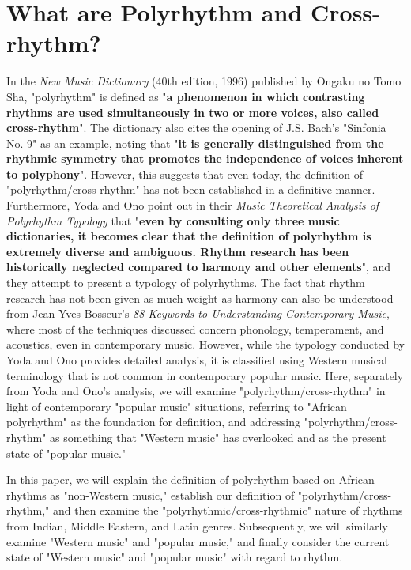 \section{What are Polyrhythm and Cross-rhythm?}

In the \textit{New Music Dictionary} (40th edition, 1996) published by Ongaku no Tomo Sha, "polyrhythm" is defined as "\textbf{a phenomenon in which contrasting rhythms are used simultaneously in two or more voices, also called cross-rhythm}"\cite{asaka:01}. The dictionary also cites the opening of J.S. Bach's "Sinfonia No. 9" as an example, noting that "\textbf{it is generally distinguished from the rhythmic symmetry that promotes the independence of voices inherent to polyphony}"\cite{asaka:01}. However, this suggests that even today, the definition of "polyrhythm/cross-rhythm" has not been established in a definitive manner. Furthermore, Yoda and Ono point out in their \textit{Music Theoretical Analysis of Polyrhythm Typology} that "\textbf{even by consulting only three music dictionaries, it becomes clear that the definition of polyrhythm is extremely diverse and ambiguous. Rhythm research has been historically neglected compared to harmony and other elements}"\cite{yoda-ono:01}, and they attempt to present a typology of polyrhythms. The fact that rhythm research has not been given as much weight as harmony can also be understood from Jean-Yves Bosseur's \textit{88 Keywords to Understanding Contemporary Music}, where most of the techniques discussed concern phonology, temperament, and acoustics, even in contemporary music. However, while the typology conducted by Yoda and Ono provides detailed analysis, it is classified using Western musical terminology that is not common in contemporary popular music. Here, separately from Yoda and Ono's analysis, we will examine "polyrhythm/cross-rhythm" in light of contemporary "popular music" situations, referring to "African polyrhythm" as the foundation for definition, and addressing "polyrhythm/cross-rhythm" as something that "Western music" has overlooked and as the present state of "popular music."

In this paper, we will explain the definition of polyrhythm based on African rhythms as "non-Western music," establish our definition of "polyrhythm/cross-rhythm," and then examine the "polyrhythmic/cross-rhythmic" nature of rhythms from Indian, Middle Eastern, and Latin genres. Subsequently, we will similarly examine "Western music" and "popular music," and finally consider the current state of "Western music" and "popular music" with regard to rhythm.

